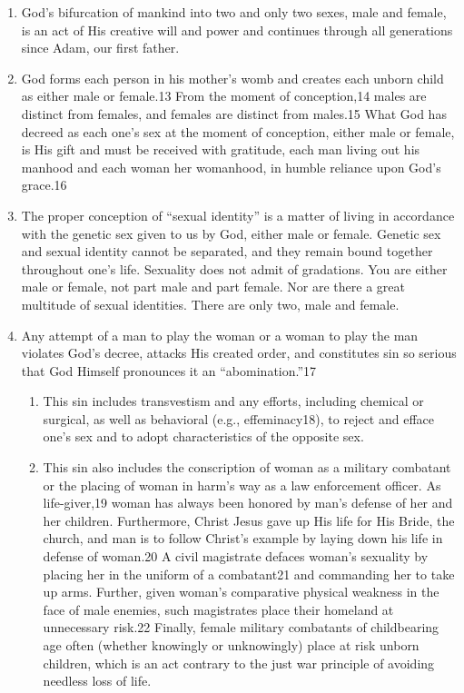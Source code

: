 \documentclass[
]{book}
\providecommand{\tightlist}{%
  \setlength{\itemsep}{0pt}\setlength{\parskip}{0pt}}
\begin{document}
\begin{enumerate}
\def\labelenumi{\arabic{enumi}.}
\setcounter{enumi}{4}
\item
  God's bifurcation of mankind into two and only two sexes, male and female, is an act of His creative will and power and continues through all generations since Adam, our first father.
\item
  God forms each person in his mother's womb and creates each unborn child as either male or female.13 From the moment of conception,14 males are distinct from females, and females are distinct from males.15 What God has decreed as each one's sex at the moment of conception, either male or female, is His gift and must be received with gratitude, each man living out his manhood and each woman her womanhood, in humble reliance upon God's grace.16
\item
  The proper conception of ``sexual identity'' is a matter of living in accordance with the genetic sex given to us by God, either male or female. Genetic sex and sexual identity cannot be separated, and they remain bound together throughout one's life. Sexuality does not admit of gradations. You are either male or female, not part male and part female. Nor are there a great multitude of sexual identities. There are only two, male and female.
\item
  Any attempt of a man to play the woman or a woman to play the man violates God's decree, attacks His created order, and constitutes sin so serious that God Himself pronounces it an ``abomination.''17

  \begin{enumerate}
  \def\labelenumii{\alph{enumii}.}
  \tightlist
  \item
    This sin includes transvestism and any efforts, including chemical or surgical, as well as behavioral (e.g., effeminacy18), to reject and efface one's sex and to adopt characteristics of the opposite sex.\\
  \item
    This sin also includes the conscription of woman as a military combatant or the placing of woman in harm's way as a law enforcement officer. As life-giver,19 woman has always been honored by man's defense of her and her children. Furthermore, Christ Jesus gave up His life for His Bride, the church, and man is to follow Christ's example by laying down his life in defense of woman.20 A civil magistrate defaces woman's sexuality by placing her in the uniform of a combatant21 and commanding her to take up arms. Further, given woman's comparative physical weakness in the face of male enemies, such magistrates place their homeland at unnecessary risk.22 Finally, female military combatants of childbearing age often (whether knowingly or unknowingly) place at risk unborn children, which is an act contrary to the just war principle of avoiding needless loss of life.
  \end{enumerate}
\end{enumerate}
\end{document}
